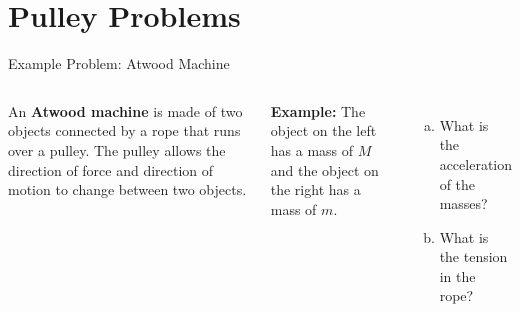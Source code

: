 \documentclass[12pt,compress,aspectratio=169]{beamer}
\begin{document}
\section{Pulley Problems}

\begin{frame}{Example Problem: Atwood Machine}
  \begin{columns}
    \centering

    An \textbf{Atwood machine} is made of two objects connected by a rope that
    runs over a pulley. The pulley allows the direction of force and direction
    of motion to change between two objects.
    
    \vspace{.2in}\textbf{Example:} The object on the left has a mass of $M$ and
    the object on the right has a mass of $m$.
    \begin{enumerate}[(a)]
    \item What is the acceleration of the masses?
    \item What is the tension in the rope?
    \end{enumerate}
  \end{columns}
\end{frame}
%
\end{document}
